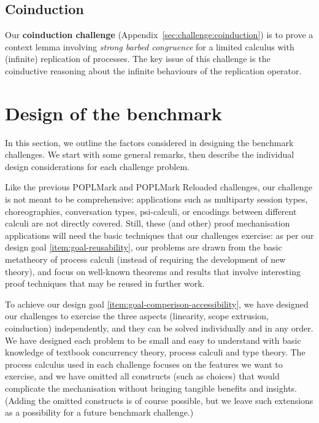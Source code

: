 \documentclass[runningheads]{llncs}
\begin{document}
\subsection{Coinduction}
Our \textbf{coinduction challenge} (Appendix~\ref{sec:challenge:coinduction}) is to prove a context lemma involving \emph{strong barbed congruence} for a limited calculus with (infinite) replication of processes.
The key issue of this challenge is the coinductive reasoning about the infinite behaviours of the replication operator.

\section{Design of the benchmark}\label{sec:design-discussion}

In this section, we outline the factors considered in designing the
benchmark challenges. We start with some general remarks, then
describe the individual design considerations for each challenge problem.

Like the previous POPLMark and POPLMark Reloaded challenges, our challenge is not meant to be comprehensive: applications such as multiparty session types, choreographies, conversation types, psi-calculi, or encodings between different calculi are not directly covered.  Still, these (and other) proof mechanisation applications will need the basic techniques that our challenges exercise:
as per our design goal \ref{item:goal-reusability},
our problems are drawn from the basic metatheory of process calculi (instead
of requiring the development of new theory), and focus on well-known theorems
and results that involve interesting proof techniques that may be reused in further work.

To achieve our design goal \ref{item:goal-comperison-accessibility},
we have designed our challenges to exercise the three aspects (linearity, scope extrusion, coinduction) independently, and they can be solved individually and in any order.
We have designed each problem to be small and easy to understand with basic knowledge of textbook concurrency theory, process calculi and type theory.  The process calculus used in each challenge
focuses on the features we want to exercise, and we have omitted all constructs
(such as choices) that would complicate the mechanisation without bringing tangible
benefits and insights.  (Adding the omitted constructs is of course possible, but we leave
such extensions as a possibility for a future benchmark challenge.)
\end{document}

